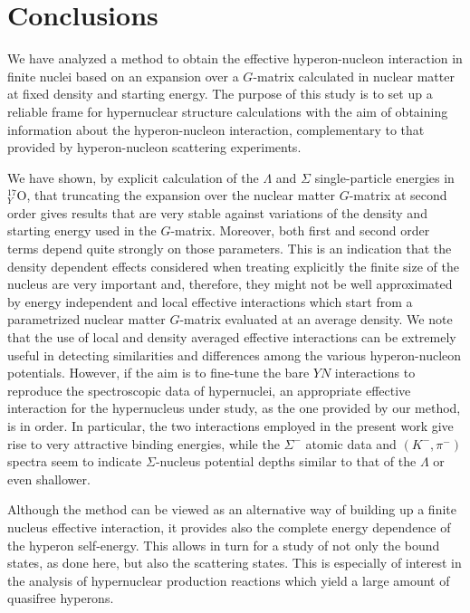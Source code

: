 \section{Conclusions}
\label{conclusions}

We have analyzed a method to obtain the effective hyperon-nucleon
interaction in finite nuclei based on an expansion over a
$G$-matrix calculated in nuclear matter at fixed density and starting energy. 
The purpose of this study is to set up a reliable frame for
hypernuclear structure 
calculations with the aim of obtaining information about the
hyperon-nucleon interaction, complementary to that provided by  
hyperon-nucleon scattering experiments.
 
We have shown, by explicit calculation of the $\Lambda$ and $\Sigma$
single-particle energies in $^{17}_Y$O, that truncating the expansion
over the nuclear matter $G$-matrix at second order gives results that 
are very stable against variations of the density and starting energy
used in the $G$-matrix. Moreover, both first and second order terms depend
quite strongly on those parameters. This is an indication that
the density dependent effects considered when treating explicitly the
finite
size of the nucleus are very important and, therefore,  
they might not be well approximated by energy independent and local effective 
interactions
which start from a parametrized  
nuclear matter $G$-matrix evaluated at an average density. 
We note that the use of local and density averaged effective
interactions can be extremely useful in detecting similarities and differences
among the various hyperon-nucleon potentials. However, if the aim is 
to fine-tune the bare $YN$ interactions to reproduce the spectroscopic
data of
hypernuclei, an appropriate effective interaction for the 
hypernucleus under study, as the one provided by our method, is in order.
In particular, the two interactions employed in the present work give rise
to very attractive binding energies, while the $\Sigma^-$ atomic data and
$(K^-,\pi^-)$ spectra seem to indicate $\Sigma$-nucleus potential depths
similar to that of the $\Lambda$ or even shallower. 
 
Although the method can be viewed as an alternative
way of building up a finite nucleus effective interaction, it
provides also the complete energy dependence of
the
hyperon self-energy. This allows in turn for a study of not only the
bound
states, as done here, but also the scattering states. This is especially  
of interest in the analysis of hypernuclear production
reactions which yield a large amount of quasifree hyperons.

